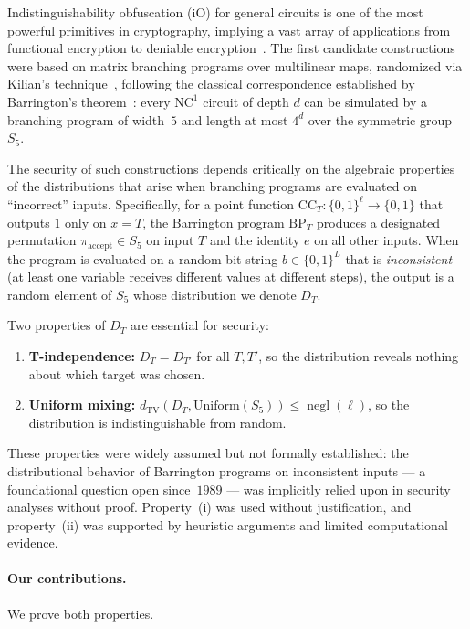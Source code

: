 \documentclass[11pt]{article}
\DeclareMathOperator{\negl}{negl}
\newcommand{\dtv}{d_{\mathrm{TV}}}
\newcommand{\CC}{\mathrm{CC}}
\newcommand{\BP}{\mathrm{BP}}
\begin{document}
Indistinguishability obfuscation (iO) for general circuits is one of the most
powerful primitives in cryptography, implying a vast array of applications from
functional encryption to deniable encryption~\cite{GGH+13,SW14}. The first
candidate constructions~\cite{GGH+13} were based on matrix branching programs
over multilinear maps, randomized via Kilian's
technique~\cite{Kil88}, following the classical correspondence established by
Barrington's theorem~\cite{Bar89}: every $\mathrm{NC}^1$ circuit of depth $d$
can be simulated by a branching program of width~$5$ and length at most $4^d$
over the symmetric group $S_5$.

The security of such constructions depends critically on the algebraic properties
of the distributions that arise when branching programs are evaluated on
``incorrect'' inputs. Specifically, for a point function $\CC_T : \{0,1\}^\ell
\to \{0,1\}$ that outputs $1$ only on $x = T$, the Barrington program $\BP_T$
produces a designated permutation $\pi_{\mathrm{accept}} \in S_5$ on input $T$
and the identity $e$ on all other inputs. When the program is evaluated on a
random bit string $b \in \{0,1\}^L$ that is \emph{inconsistent} (at least one
variable receives different values at different steps), the output is a random
element of $S_5$ whose distribution we denote $D_T$.

Two properties of $D_T$ are essential for security:

\begin{enumerate}[label=(\roman*)]
\item \textbf{T-independence:} $D_T = D_{T'}$ for all $T, T'$, so the
  distribution reveals nothing about which target was chosen.
\item \textbf{Uniform mixing:} $\dtv(D_T, \mathrm{Uniform}(S_5)) \leq \negl(\ell)$,
  so the distribution is indistinguishable from random.
\end{enumerate}

These properties were widely assumed but not formally established:
the distributional behavior of Barrington programs on inconsistent inputs
--- a foundational question open since~$1989$ --- was implicitly relied upon
in security analyses without proof.
Property~(i) was used without justification, and property~(ii)
was supported by heuristic arguments and limited computational evidence.

\paragraph{Our contributions.}
We prove both properties.
\end{document}
